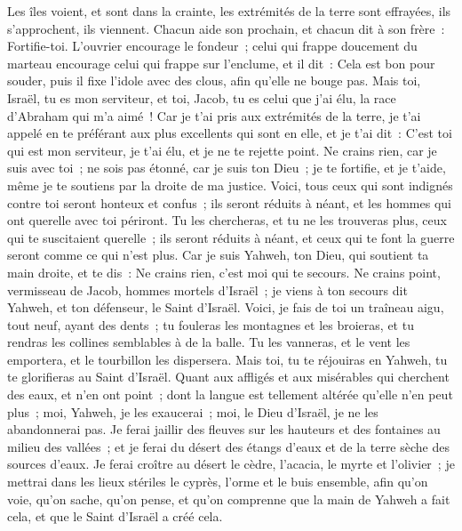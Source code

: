 \begin{multicols}{2}
Les îles voient, et sont dans la crainte, les extrémités de la terre sont effrayées, ils s'approchent, ils viennent.
Chacun aide son prochain, et chacun dit à son frère~: Fortifie-toi.
L'ouvrier encourage le fondeur~; celui qui frappe doucement du marteau encourage celui qui frappe sur l'enclume, et il dit~: Cela est bon pour souder, puis il fixe l'idole avec des clous, afin qu'elle ne bouge pas.
Mais toi, Israël, tu es mon serviteur, et toi, Jacob, tu es celui que j'ai élu, la race d'Abraham qui m'a aimé~!
Car je t'ai pris aux extrémités de la terre, je t'ai appelé en te préférant aux plus excellents qui sont en elle, et je t'ai dit~: C'est toi qui est mon serviteur, je t'ai élu, et je ne te rejette point.
Ne crains rien, car je suis avec toi~; ne sois pas étonné, car je suis ton Dieu~; je te fortifie, et je t'aide, même je te soutiens par la droite de ma justice.
Voici, tous ceux qui sont indignés contre toi seront honteux et confus~; ils seront réduits à néant, et les hommes qui ont querelle avec toi périront.
Tu les chercheras, et tu ne les trouveras plus, ceux qui te suscitaient querelle~; ils seront réduits à néant, et ceux qui te font la guerre seront comme ce qui n'est plus.
Car je suis Yahweh, ton Dieu, qui soutient ta main droite, et te dis~: Ne crains rien, c'est moi qui te secours.
Ne crains point, vermisseau de Jacob, hommes mortels d'Israël~; je viens à ton secours dit Yahweh, et ton défenseur, le Saint d'Israël.
Voici, je fais de toi un traîneau aigu, tout neuf, ayant des dents~; tu fouleras les montagnes et les broieras, et tu rendras les collines semblables à de la balle.
Tu les vanneras, et le vent les emportera, et le tourbillon les dispersera. Mais toi, tu te réjouiras en Yahweh, tu te glorifieras au Saint d'Israël.
Quant aux affligés et aux misérables qui cherchent des eaux, et n'en ont point~; dont la langue est tellement altérée qu'elle n'en peut plus~; moi, Yahweh, je les exaucerai~; moi, le Dieu d'Israël, je ne les abandonnerai pas.
Je ferai jaillir des fleuves sur les hauteurs et des fontaines au milieu des vallées~; et je ferai du désert des étangs d'eaux et de la terre sèche des sources d'eaux.
Je ferai croître au désert le cèdre, l'acacia, le myrte et l'olivier~; je mettrai dans les lieux stériles le cyprès, l'orme et le buis ensemble,
afin qu'on voie, qu'on sache, qu'on pense, et qu'on comprenne que la main de Yahweh a fait cela, et que le Saint d'Israël a créé cela.

\end{multicols}
